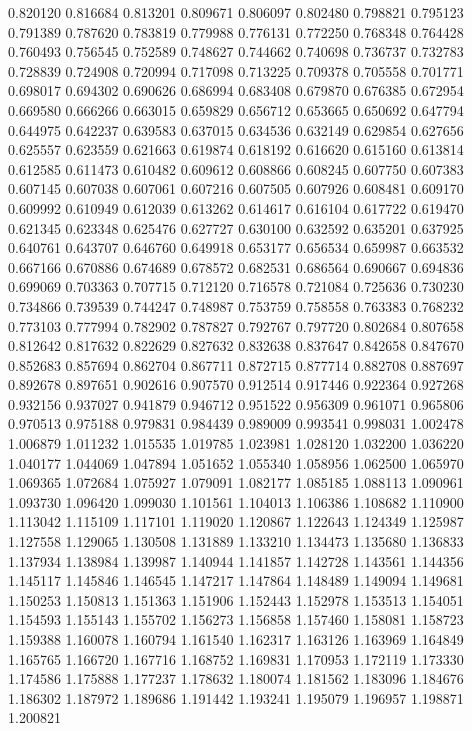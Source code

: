 0.820120
0.816684
0.813201
0.809671
0.806097
0.802480
0.798821
0.795123
0.791389
0.787620
0.783819
0.779988
0.776131
0.772250
0.768348
0.764428
0.760493
0.756545
0.752589
0.748627
0.744662
0.740698
0.736737
0.732783
0.728839
0.724908
0.720994
0.717098
0.713225
0.709378
0.705558
0.701771
0.698017
0.694302
0.690626
0.686994
0.683408
0.679870
0.676385
0.672954
0.669580
0.666266
0.663015
0.659829
0.656712
0.653665
0.650692
0.647794
0.644975
0.642237
0.639583
0.637015
0.634536
0.632149
0.629854
0.627656
0.625557
0.623559
0.621663
0.619874
0.618192
0.616620
0.615160
0.613814
0.612585
0.611473
0.610482
0.609612
0.608866
0.608245
0.607750
0.607383
0.607145
0.607038
0.607061
0.607216
0.607505
0.607926
0.608481
0.609170
0.609992
0.610949
0.612039
0.613262
0.614617
0.616104
0.617722
0.619470
0.621345
0.623348
0.625476
0.627727
0.630100
0.632592
0.635201
0.637925
0.640761
0.643707
0.646760
0.649918
0.653177
0.656534
0.659987
0.663532
0.667166
0.670886
0.674689
0.678572
0.682531
0.686564
0.690667
0.694836
0.699069
0.703363
0.707715
0.712120
0.716578
0.721084
0.725636
0.730230
0.734866
0.739539
0.744247
0.748987
0.753759
0.758558
0.763383
0.768232
0.773103
0.777994
0.782902
0.787827
0.792767
0.797720
0.802684
0.807658
0.812642
0.817632
0.822629
0.827632
0.832638
0.837647
0.842658
0.847670
0.852683
0.857694
0.862704
0.867711
0.872715
0.877714
0.882708
0.887697
0.892678
0.897651
0.902616
0.907570
0.912514
0.917446
0.922364
0.927268
0.932156
0.937027
0.941879
0.946712
0.951522
0.956309
0.961071
0.965806
0.970513
0.975188
0.979831
0.984439
0.989009
0.993541
0.998031
1.002478
1.006879
1.011232
1.015535
1.019785
1.023981
1.028120
1.032200
1.036220
1.040177
1.044069
1.047894
1.051652
1.055340
1.058956
1.062500
1.065970
1.069365
1.072684
1.075927
1.079091
1.082177
1.085185
1.088113
1.090961
1.093730
1.096420
1.099030
1.101561
1.104013
1.106386
1.108682
1.110900
1.113042
1.115109
1.117101
1.119020
1.120867
1.122643
1.124349
1.125987
1.127558
1.129065
1.130508
1.131889
1.133210
1.134473
1.135680
1.136833
1.137934
1.138984
1.139987
1.140944
1.141857
1.142728
1.143561
1.144356
1.145117
1.145846
1.146545
1.147217
1.147864
1.148489
1.149094
1.149681
1.150253
1.150813
1.151363
1.151906
1.152443
1.152978
1.153513
1.154051
1.154593
1.155143
1.155702
1.156273
1.156858
1.157460
1.158081
1.158723
1.159388
1.160078
1.160794
1.161540
1.162317
1.163126
1.163969
1.164849
1.165765
1.166720
1.167716
1.168752
1.169831
1.170953
1.172119
1.173330
1.174586
1.175888
1.177237
1.178632
1.180074
1.181562
1.183096
1.184676
1.186302
1.187972
1.189686
1.191442
1.193241
1.195079
1.196957
1.198871
1.200821
